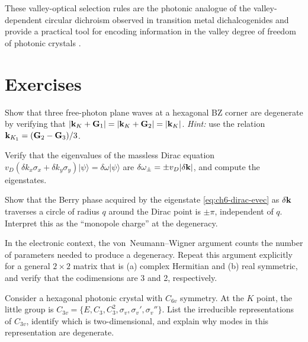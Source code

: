These valley-optical selection rules are the photonic analogue
of the valley-dependent circular dichroism observed in transition
metal dichalcogenides and provide a practical tool for encoding
information in the valley degree of freedom of photonic crystals
\cite{he2016photonic,gao2017topologically}.

\section*{Exercises}

\begin{exercise}
  Show that three free-photon plane waves at a hexagonal BZ corner are
  degenerate by verifying that $|\mathbf{k}_K+\mathbf{G}_1|=|\mathbf{k}_K+\mathbf{G}_2|
  =|\mathbf{k}_K|$.  \emph{Hint:} use the relation
  $\mathbf{k}_{K_1}=(\mathbf{G}_2-\mathbf{G}_3)/3$.
\end{exercise}

\begin{exercise}
  Verify that the eigenvalues of the massless Dirac equation
  $v_D(\delta k_x\sigma_x+\delta k_y\sigma_y)|\psi\rangle
  =\delta\omega|\psi\rangle$ are $\delta\omega_\pm=\pm v_D|\delta\mathbf{k}|$,
  and compute the eigenstates.
\end{exercise}

\begin{exercise}
  Show that the Berry phase acquired by the eigenstate
  \eqref{eq:ch6-dirac-evec} as $\delta\mathbf{k}$ traverses a circle of
  radius $q$ around the Dirac point is $\pm\pi$, independent of $q$.
  Interpret this as the ``monopole charge'' at the degeneracy.
\end{exercise}

\begin{exercise}
  In the electronic context, the von~Neumann--Wigner argument counts
  the number of parameters needed to produce a degeneracy.  Repeat
  this argument explicitly for a general $2\times 2$ matrix that is
  (a) complex Hermitian and (b) real symmetric, and verify that the
  codimensions are 3 and 2, respectively.
\end{exercise}

\begin{exercise}
  Consider a hexagonal photonic crystal with $C_{6v}$ symmetry.  At the
  $K$ point, the little group is $C_{3v}=\{E,C_3,C_3^2,\sigma_v,
  \sigma_v',\sigma_v''\}$.  List the irreducible representations of
  $C_{3v}$, identify which is two-dimensional, and explain why modes
  in this representation are degenerate.
\end{exercise}
